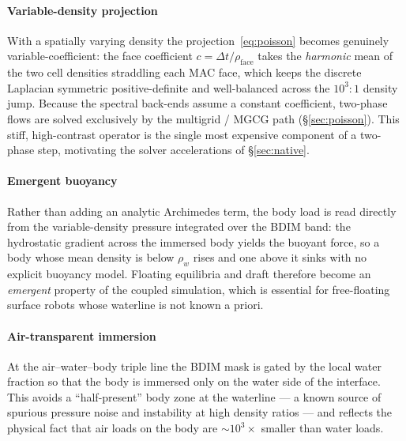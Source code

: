 \documentclass[journal,twoside,10pt]{IEEEtran}
\begin{document}
\paragraph{Variable-density projection}
With a spatially varying density the projection~\eqref{eq:poisson}
becomes genuinely variable-coefficient: the face coefficient
$c=\Delta t/\rho_\mathrm{face}$ takes the \emph{harmonic} mean of the
two cell densities straddling each MAC face, which keeps the discrete
Laplacian symmetric positive-definite and well-balanced across the
$10^3{:}1$ density jump.  Because the spectral back-ends assume a
constant coefficient, two-phase flows are solved exclusively by the
multigrid / MGCG path (§\ref{sec:poisson}).  This stiff,
high-contrast operator is the single most expensive component of a
two-phase step, motivating the solver accelerations of
§\ref{sec:native}.

\paragraph{Emergent buoyancy}
Rather than adding an analytic Archimedes term, the body load is read
directly from the variable-density pressure integrated over the BDIM
band: the hydrostatic gradient across the immersed body yields the
buoyant force, so a body whose mean density is below $\rho_w$ rises and
one above it sinks with no explicit buoyancy model.  Floating
equilibria and draft therefore become an \emph{emergent} property of
the coupled simulation, which is essential for free-floating surface
robots whose waterline is not known a priori.

\paragraph{Air-transparent immersion}
At the air--water--body triple line the BDIM mask is gated by the local
water fraction so that the body is immersed only on the water side of
the interface.  This avoids a ``half-present'' body zone at the
waterline --- a known source of spurious pressure noise and instability
at high density ratios --- and reflects the physical fact that air
loads on the body are $\sim\!10^3\times$ smaller than water loads.
\end{document}
